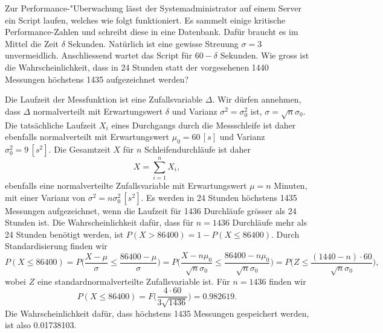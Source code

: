 Zur Performance-"Uberwachung lässt der Systemadministrator auf einem Server
ein Script laufen, welches wie folgt funktioniert. Es sammelt einige
kritische Performance-Zahlen und schreibt diese in eine Datenbank.
Dafür braucht es im Mittel die Zeit $\delta$ Sekunden. Natürlich
ist eine gewisse Streuung $\sigma=3$ unvermeidlich.
Anschliessend wartet das Script für $60-\delta$ Sekunden.
Wie gross ist die Wahrscheinlichkeit, dass in 24 Stunden statt
der vorgesehenen 1440 Messungen höchstens 1435 aufgezeichnet werden?


\begin{loesung}
Die Laufzeit der Messfunktion ist eine Zufallsvariable $\Delta$.
Wir dürfen annehmen, dass $\Delta$ normalverteilt mit Erwartungswert
$\delta$ und Varianz $\sigma^2=\sigma_0^2$ ist, $\sigma=\sqrt{n}\sigma_0$.
Die tatsächliche Laufzeit $X_i$ eines
Durchgangs durch die Messschleife ist daher ebenfalls normalverteilt
mit Erwartungswert $\mu_0=60\,[s]$ und Varianz $\sigma_0^2=9\,[s^2]$.
Die Gesamtzeit $X$ für
$n$ Schleifendurchläufe ist daher
\[
X=\sum_{i=1}^nX_i,
\]
ebenfalls eine normalverteilte Zufallsvariable
mit Erwartungswert $\mu = n$ Minuten,
mit einer Varianz von $\sigma^2=n\sigma_0^2\,[s^2]$.
Es werden in 24 Stunden höchstens 1435 Messungen aufgezeichnet,
wenn die Laufzeit für
1436 Durchläufe grösser als 24 Stunden ist. Die Wahrscheinlichkeit dafür,
dass für $n=1436$ Durchläufe mehr als 24 Stunden benötigt werden, 
ist $P(X > 86400) = 1-P(X\le 86400)$.
Durch Standardisierung finden wir
\[
P(X\le 86400)=P\biggl(
\frac{X-\mu}{\sigma}
\le
\frac{86400-\mu}{\sigma}
\biggr)
=
P\biggl(
\frac{X-n\mu_0}{\sqrt{n}\sigma_0}
\le
\frac{86400-n\mu_0}{\sqrt{n}\sigma_0}
\biggr)
=
P\biggl(
Z\le\frac{(1440-n)\cdot 60}{\sqrt{n}\sigma_0}
\biggr),
\]
wobei $Z$ eine standardnormalverteilte Zufallsvariable ist. Für $n=1436$
finden wir
\[
P(X\le 86400)=F\biggl(
\frac{4\cdot 60}{3\sqrt{1436}}
\biggr)=0.982619.
\]
Die Wahrscheinlichkeit dafür, dass höchstens 1435 Messungen gespeichert
werden, ist also 0.01738103.
\end{loesung}
